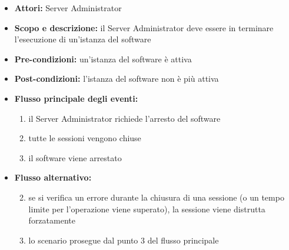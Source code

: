
\begin{itemize}
	\item \textbf{Attori:} Server Administrator
	\item \textbf{Scopo e descrizione:} il Server Administrator deve essere in terminare l'esecuzione di un'istanza del software
	\item \textbf{Pre-condizioni:} un'istanza del software è attiva
	\item \textbf{Post-condizioni:} l'istanza del software non è più attiva
	\item \textbf{Flusso principale degli eventi:}
		\begin{enumerate}
			\item il Server Administrator richiede l'arresto del software
			\item tutte le sessioni vengono chiuse
			\item il software viene arrestato
		\end{enumerate}
	\item \textbf{Flusso alternativo:}
		\begin{enumerate}
			\setcounter{enumi}{1}
			\item se si verifica un errore durante la chiusura di una sessione (o un tempo limite per l'operazione viene superato), la sessione viene distrutta forzatamente
			\item lo scenario prosegue dal punto 3 del flusso principale
		\end{enumerate}
\end{itemize}
